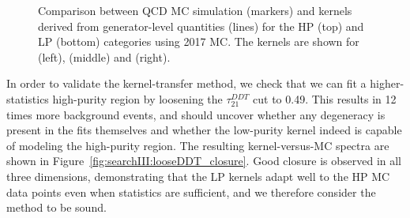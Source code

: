 \begin{figure}[h!]
\caption{Comparison between QCD MC simulation (markers) and kernels derived from generator-level quantities (lines) for the HP (top) and LP (bottom) categories using 2017 MC. The kernels are shown for \MJO (left), \MJT (middle) and \MVV (right).}
\label{fig:searchIII:3Dkernels}
\end{figure}
In order to validate the kernel-transfer method, we check that we can fit a higher-statistics high-purity region by loosening the $\tau_{21}^{DDT}$ cut to 0.49. This results in 12 times more background events, and should uncover whether any degeneracy is present in the fits themselves and whether the low-purity kernel indeed is capable of modeling the high-purity region. The resulting kernel-versus-MC spectra are shown in Figure~\ref{fig:searchIII:looseDDT_closure}. Good closure is observed in all three dimensions, demonstrating that the LP kernels adapt well to the HP MC data points even when statistics are sufficient, and we therefore consider the method to be sound.
